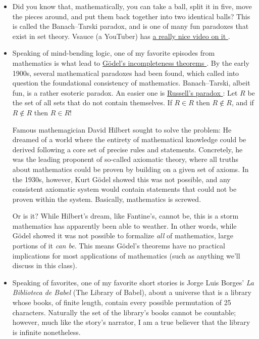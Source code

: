 \documentclass{article}
\begin{document}
\begin{itemize}[label=$\bullet$]
  \item Did you know that, mathematically, you can take a ball, split it in five, move the pieces around, and put them back together into two identical balls? This is called the Banach–Tarski paradox, and is one of many fun paradoxes that exist in set theory. Vsauce (a YouTuber) has \href{https://www.youtube.com/watch?v=s86-Z-CbaHA}{ a really nice video on it \ExternalLink}.

  \item Speaking of mind-bending logic, one of my favorite episodes from mathematics is what lead to \href{https://en.wikipedia.org/wiki/G%C3%B6del%27s_incompleteness_theorems}{Gödel's incompleteness theorems \ExternalLink}. By the early 1900s, several mathematical paradoxes had been found, which called into question the foundational consistency of mathematics. Banach–Tarski, albeit fun, is a rather esoteric paradox. An easier one is \href{https://en.wikipedia.org/wiki/Russell%27s_paradox}{Russell's paradox \ExternalLink}: Let $R$ be the set of all sets that do not contain themselves. If $R \in R$ then $R \notin R$, and if $R \notin R$ then $R \in R$!

    Famous mathemagician David Hilbert sought to solve the problem: He dreamed of a world where the entirety of mathematical knowledge could be derived following a core set of precise rules and statements. Concretely, he was the leading proponent of so-called axiomatic theory, where all truths about mathematics could be proven by building on a given set of axioms. In the 1930s, however, Kurt Gödel showed this was not possible, and any consistent axiomatic system would contain statements that could not be proven within the system. Basically, mathematics is screwed.

    Or is it? While Hilbert's dream, like Fantine's, cannot be, this is a storm mathematics has apparently been able to weather. In other words, while Gödel showed it was not possible to formalize \textit{all} of mathematics, large portions of it \textit{can be}. This means Gödel's theorems have no practical implications for most applications of mathematics (such as anything we'll discuss in this class).

  \item Speaking of favorites, one of my favorite short stories is Jorge Luis Borges' \textit{La Biblioteca de Babel} (The Library of Babel), about a universe that is a library whose books, of finite length, contain every possible permutation of 25 characters. Naturally the set of the library's books cannot be countable; however, much like the story's narrator, I am a true believer that the library is infinite nonetheless.


\end{itemize}
\end{document}
